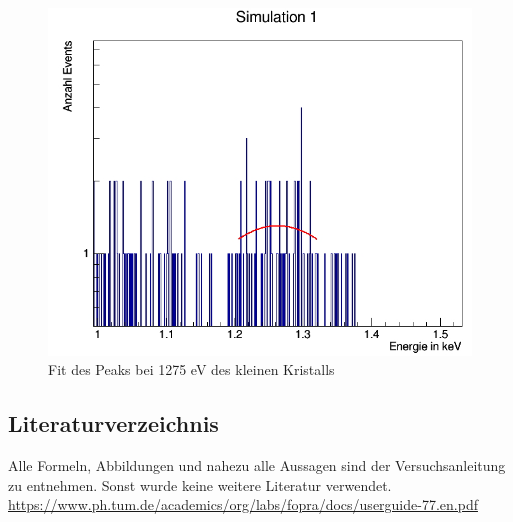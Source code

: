 \documentclass[a4paper,11pt,twoside]{article}
\begin{document}
\begin{figure}[H]
	\begin{center}
		\includegraphics[width=0.7\linewidth]{Simulation2_1275_fit}
		\caption{Fit des Peaks bei 1275 eV des kleinen Kristalls}
		\label{}
	\end{center}
\end{figure}


		
	\subsection{Literaturverzeichnis}
		Alle Formeln, Abbildungen und nahezu alle Aussagen sind der Versuchsanleitung zu entnehmen. 
	Sonst wurde keine weitere Literatur verwendet.\\
	\url{https://www.ph.tum.de/academics/org/labs/fopra/docs/userguide-77.en.pdf} \\
	
%
%
%
%
%
\end{document}
